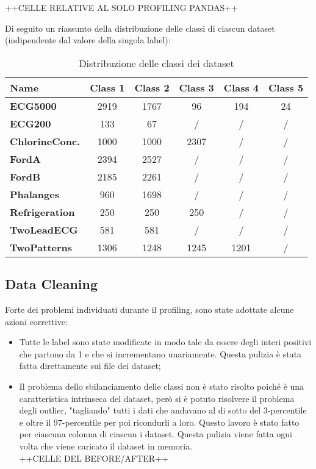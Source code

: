 ++CELLE RELATIVE AL SOLO PROFILING PANDAS++

Di seguito un riassunto della distribuzione delle classi di ciascun dataset (indipendente dal valore della singola label):
\begin{table}[H]
	\centering
	\begin{tabularx}{\textwidth}{X c c c c c}
		\hline
		\textbf{Name} & \textbf{Class 1} & \textbf{Class 2} & \textbf{Class 3} & \textbf{Class 4} & \textbf{Class 5} \\
		\hline
		\textbf{ECG5000} & 2919 & 1767 & 96 & 194 & 24\\
		\textbf{ECG200} & 133 & 67 & / & / & /\\
		\textbf{ChlorineConc.} & 1000 & 1000 & 2307 & / & /\\
		\textbf{FordA} & 2394 & 2527 & / & / & /\\
		\textbf{FordB} & 2185 & 2261 & / & / & /\\
		\textbf{Phalanges} & 960 & 1698 & / & / & /\\
		\textbf{Refrigeration} & 250 & 250 & 250 & / & /\\
		\textbf{TwoLeadECG} & 581 & 581 & / & / & /\\
		\textbf{TwoPatterns} & 1306 & 1248 & 1245 & 1201 & /\\
	\end{tabularx}
	\caption{Distribuzione delle classi dei dataset}
	\label{tab:labels}
\end{table}

\subsection{Data Cleaning}
Forte dei problemi individuati durante il profiling, sono state adottate alcune azioni correttive:
\begin{itemize}
	\item Tutte le label sono state modificate in modo tale da essere degli interi positivi che partono da 1 e che si incrementano unariamente. Questa pulizia è stata fatta direttamente sui file dei dataset;
	\item Il problema dello sbilanciamento delle classi non è stato risolto poiché è una caratteristica intrinseca del dataset, però si è potuto risolvere il problema degli outlier, "tagliando" tutti i dati che andavano al di sotto del 3-percentile e oltre il 97-percentile per poi ricondurli a loro. Questo lavoro è stato fatto per ciascuna colonna di ciascun i dataset. Questa pulizia viene fatta ogni volta che viene caricato il dataset in memoria.\\
	++CELLE DEL BEFORE/AFTER++
\end{itemize}

